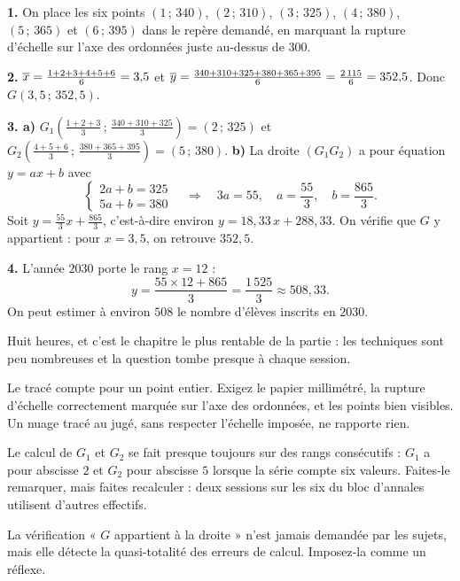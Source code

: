 \begin{corrige}
\textbf{1.} On place les six points $(1\,;\,340)$, $(2\,;\,310)$,
$(3\,;\,325)$, $(4\,;\,380)$, $(5\,;\,365)$ et $(6\,;\,395)$ dans le repère
demandé, en marquant la rupture d'échelle sur l'axe des ordonnées juste
au-dessus de $300$.

\textbf{2.} $\overline{x} = \frac{1+2+3+4+5+6}{6} = 3{,}5$ et
$\overline{y} = \frac{340+310+325+380+365+395}{6} = \frac{2\,115}{6} = 352{,}5$.
Donc $G(3{,}5\,;\,352{,}5)$.

\textbf{3. a)} $G_{1}\left(\frac{1+2+3}{3}\,;\,\frac{340+310+325}{3}\right)
= (2\,;\,325)$ et
$G_{2}\left(\frac{4+5+6}{3}\,;\,\frac{380+365+395}{3}\right)
= (5\,;\,380)$.
\textbf{b)} La droite $\left(G_{1}G_{2}\right)$ a pour équation
$y = ax+b$ avec
\[
  \begin{cases} 2a+b = 325\\ 5a+b = 380 \end{cases}
  \quad\Longrightarrow\quad
  3a = 55, \quad a = \frac{55}{3}, \quad b = \frac{865}{3}.
\]
Soit $y = \frac{55}{3}x+\frac{865}{3}$, c'est-à-dire environ
$y = 18{,}33\,x+288{,}33$.
On vérifie que $G$ y appartient : pour $x = 3{,}5$, on retrouve $352{,}5$.

\textbf{4.} L'année $2030$ porte le rang $x = 12$ :
\[
  y = \frac{55\times12+865}{3} = \frac{1\,525}{3} \approx 508{,}33 .
\]
On peut estimer à environ $508$ le nombre d'élèves inscrits en $2030$.
\end{corrige}

\begin{notepourlaclasse}
Huit heures, et c'est le chapitre le plus rentable de la partie : les
techniques sont peu nombreuses et la question tombe presque à chaque
session.

Le tracé compte pour un point entier. Exigez le papier millimétré, la
rupture d'échelle correctement marquée sur l'axe des ordonnées, et les
points bien visibles. Un nuage tracé au jugé, sans respecter l'échelle
imposée, ne rapporte rien.

Le calcul de $G_{1}$ et $G_{2}$ se fait presque toujours sur des rangs
consécutifs : $G_{1}$ a pour abscisse $2$ et $G_{2}$ pour abscisse $5$
lorsque la série compte six valeurs. Faites-le remarquer, mais faites
recalculer : deux sessions sur les six du bloc d'annales utilisent d'autres
effectifs.

La vérification « $G$ appartient à la droite » n'est jamais demandée par les
sujets, mais elle détecte la quasi-totalité des erreurs de calcul. Imposez-la
comme un réflexe.
\end{notepourlaclasse}
